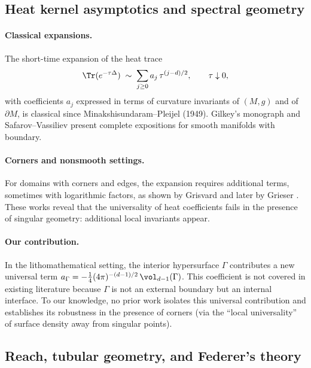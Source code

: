 \subsection{Heat kernel asymptotics and spectral geometry}

\paragraph{Classical expansions.}
The short-time expansion of the heat trace
\[
\Tr(e^{-\tau \Delta}) \;\sim\; \sum_{j\ge 0} a_j\, \tau^{(j-d)/2},
\qquad \tau\downarrow 0,
\]
with coefficients $a_j$ expressed in terms of curvature invariants of $(M,g)$ and of $\partial M$,
is classical since Minakshisundaram--Pleijel (1949). 
Gilkey’s monograph \cite{Gilkey1995} and Safarov--Vassiliev \cite{SafarovVassiliev1997} 
present complete expositions for smooth manifolds with boundary. 

\paragraph{Corners and nonsmooth settings.}
For domains with corners and edges, the expansion requires additional terms, sometimes with logarithmic factors, 
as shown by Grisvard \cite{Grisvard1985} and later by Grieser \cite{Grieser2002}. 
These works reveal that the universality of heat coefficients fails in the presence of singular geometry: 
additional local invariants appear. 

\paragraph{Our contribution.}
In the lithomathematical setting, the interior hypersurface $\Gamma$ contributes 
a new universal term $a_\Gamma = -\tfrac14 (4\pi)^{-(d-1)/2}\,\vol_{d-1}(\Gamma)$. 
This coefficient is not covered in existing literature because $\Gamma$ is not an external boundary but an internal interface. 
To our knowledge, no prior work isolates this universal contribution and establishes its robustness in the presence of corners 
(via the ``local universality'' of surface density away from singular points). 

\subsection{Reach, tubular geometry, and Federer’s theory}

